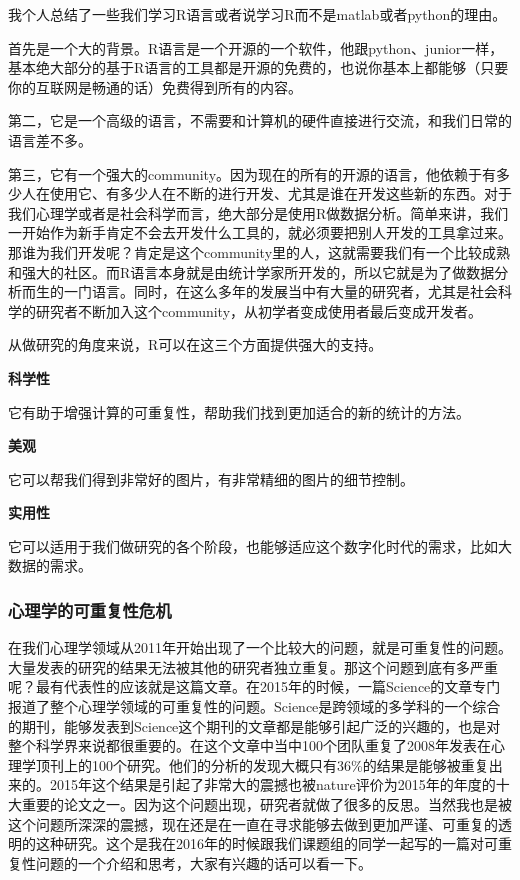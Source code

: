 \documentclass[
  oneside]{book}
\begin{document}
我个人总结了一些我们学习R语言或者说学习R而不是matlab或者python的理由。

首先是一个大的背景。R语言是一个开源的一个软件，他跟python、junior一样，基本绝大部分的基于R语言的工具都是开源的免费的，也说你基本上都能够（只要你的互联网是畅通的话）免费得到所有的内容。

第二，它是一个高级的语言，不需要和计算机的硬件直接进行交流，和我们日常的语言差不多。

第三，它有一个强大的community。因为现在的所有的开源的语言，他依赖于有多少人在使用它、有多少人在不断的进行开发、尤其是谁在开发这些新的东西。对于我们心理学或者是社会科学而言，绝大部分是使用R做数据分析。简单来讲，我们一开始作为新手肯定不会去开发什么工具的，就必须要把别人开发的工具拿过来。那谁为我们开发呢？肯定是这个community里的人，这就需要我们有一个比较成熟和强大的社区。而R语言本身就是由统计学家所开发的，所以它就是为了做数据分析而生的一门语言。同时，在这么多年的发展当中有大量的研究者，尤其是社会科学的研究者不断加入这个community，从初学者变成使用者最后变成开发者。

从做研究的角度来说，R可以在这三个方面提供强大的支持。

\textbf{科学性}

它有助于增强计算的可重复性，帮助我们找到更加适合的新的统计的方法。

\textbf{美观}

它可以帮我们得到非常好的图片，有非常精细的图片的细节控制。

\textbf{实用性}

它可以适用于我们做研究的各个阶段，也能够适应这个数字化时代的需求，比如大数据的需求。

\hypertarget{ux5fc3ux7406ux5b66ux7684ux53efux91cdux590dux6027ux5371ux673a}{%
\subsubsection{心理学的可重复性危机}\label{ux5fc3ux7406ux5b66ux7684ux53efux91cdux590dux6027ux5371ux673a}}

在我们心理学领域从2011年开始出现了一个比较大的问题，就是可重复性的问题。大量发表的研究的结果无法被其他的研究者独立重复。那这个问题到底有多严重呢？最有代表性的应该就是这篇文章。在2015年的时候，一篇Science的文章专门报道了整个心理学领域的可重复性的问题。Science是跨领域的多学科的一个综合的期刊，能够发表到Science这个期刊的文章都是能够引起广泛的兴趣的，也是对整个科学界来说都很重要的。在这个文章中当中100个团队重复了2008年发表在心理学顶刊上的100个研究。他们的分析的发现大概只有36\%的结果是能够被重复出来的。2015年这个结果是引起了非常大的震撼也被nature评价为2015年的年度的十大重要的论文之一。因为这个问题出现，研究者就做了很多的反思。当然我也是被这个问题所深深的震撼，现在还是在一直在寻求能够去做到更加严谨、可重复的透明的这种研究。这个是我在2016年的时候跟我们课题组的同学一起写的一篇对可重复性问题的一个介绍和思考，大家有兴趣的话可以看一下。
\end{document}
